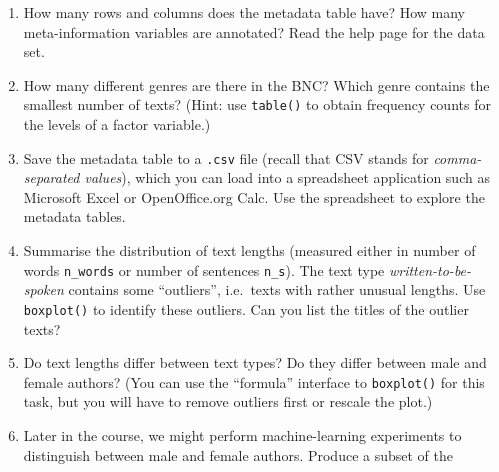 \documentclass[a4paper,12pt]{article}
\begin{document}
\begin{enumerate}
\item How many rows and columns does the metadata table have?  How many
  meta-information variables are annotated?  Read the help page for the data set.
\item How many different genres are there in the BNC?  Which genre contains
  the smallest number of texts?  (Hint: use \texttt{table()} to obtain
  frequency counts for the levels of a factor variable.)
\item Save the metadata table to a \texttt{.csv} file (recall that CSV stands
  for \emph{comma-separated values}), which you can load into a spreadsheet
  application such as Microsoft Excel or OpenOffice.org Calc.  Use the
  spreadsheet to explore the metadata tables.
\item Summarise the distribution of text lengths (measured either in number of
  words \verb|n_words| or number of sentences \verb|n_s|).  The text type
  \emph{written-to-be-spoken} contains some ``outliers'', i.e.\ texts with
  rather unusual lengths.  Use \texttt{boxplot()} to identify these outliers.  
  Can you list the titles of the outlier texts?
\item Do text lengths differ between text types?  Do they differ between male
  and female authors?  (You can use the ``formula'' interface to
  \texttt{boxplot()} for this task, but you will have to remove outliers first
  or rescale the plot.)
\item Later in the course, we might perform machine-learning experiments to
  distinguish between male and female authors.  Produce a subset of the

\end{enumerate}
\end{document}

